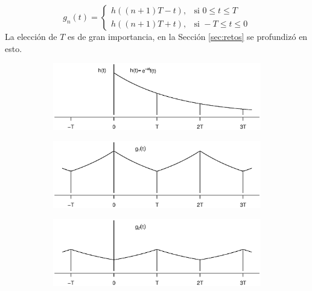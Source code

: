 \documentclass[11pt]{article}
\numberwithin{equation}{section} %
\begin{document}
\[
g_n(t) =
\begin{cases}
h((n+1)T-t), & \mbox{si } 0 \leq t \leq T \\
h((n+1)T+t), & \mbox{si } -T \leq t \leq 0
\end{cases}
\]
La elección de $T$ es de gran importancia, en la Sección \ref{sec:retos} se profundizó en esto.\\

\begin{figure}[htbp]
\centering

\begin{subfigure}[b]{\textwidth}
\centering
\includegraphics[width=\textwidth,trim=0 1.5cm 0 2.5cm]{ft.eps}
\end{subfigure}

\begin{subfigure}[b]{\textwidth}
\centering
\includegraphics[width=\textwidth,trim=0 1.5cm 0 2.5cm]{g1t.eps}
\end{subfigure}

\begin{subfigure}[b]{\textwidth}
\centering
\includegraphics[width=\textwidth,trim=0 1.5cm 0 2.5cm]{g2t.eps}
\end{subfigure}


\end{figure}
\end{document}
